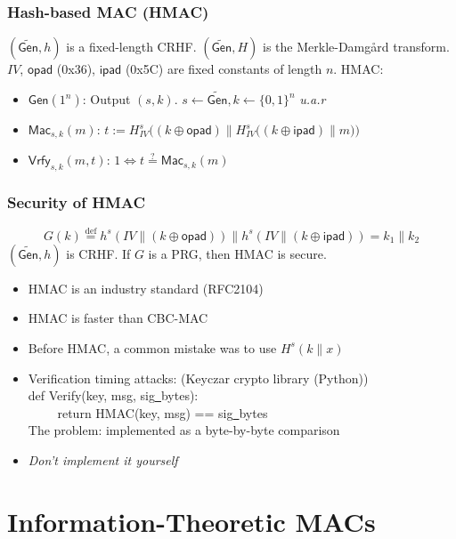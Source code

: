 \begin{frame}\frametitle{Hash-based MAC (HMAC)}
\begin{figure}
\begin{center}

\end{center}
\end{figure}
\begin{construction}
$(\widetilde{\mathsf{Gen}}, h)$ is a fixed-length CRHF. $(\widetilde{\mathsf{Gen}}, H)$ is the Merkle-Damg\r{a}rd transform.
$IV$, $\mathsf{opad}$ (0x36), $\mathsf{ipad}$ (0x5C) are fixed constants of length $n$.
HMAC:
\begin{itemize}
\item $\mathsf{Gen}(1^n)$: Output $(s, k)$. $s \gets \widetilde{\mathsf{Gen}}, k \gets \{0,1\}^n$ \emph{u.a.r}
\item $\mathsf{Mac}_{s,k}(m)$: $t := H_{IV}^s\Big((k \oplus \mathsf{opad}) \| H_{IV}^s\big((k \oplus \mathsf{ipad}) \| m\big)\Big)$
\item $\mathsf{Vrfy}_{s,k}(m,t)$: $1 \iff t \overset{?}{=} \mathsf{Mac}_{s,k}(m)$
\end{itemize}
\end{construction}
\end{frame}
\begin{frame}\frametitle{Security of HMAC}
\begin{theorem}
\[ G(k) \overset{\text{def}}{=} h^s(IV\| (k\oplus \mathsf{opad})) \| 
h^s(IV\| (k\oplus \mathsf{ipad})) = k_1\| k_2
\]
$(\widetilde{\mathsf{Gen}}, h)$ is CRHF. If $G$ is a PRG, then HMAC is secure.
\end{theorem}
\begin{itemize}
\item HMAC is an industry standard (RFC2104)
\item HMAC is faster than CBC-MAC
\item Before HMAC, a common mistake was to use $H^s(k\| x)$
\item \alert{Verification timing attacks: (Keyczar crypto library (Python))} \\
def Verify(key, msg, sig\underline{\ }bytes): \\
$\qquad$ return HMAC(key, msg) == sig\underline{\ }bytes \\
The problem:  implemented as a byte-by-byte comparison
\item \alert{\emph{Don't implement it yourself}}
\end{itemize}
\end{frame}
\section{Information-Theoretic MACs}

